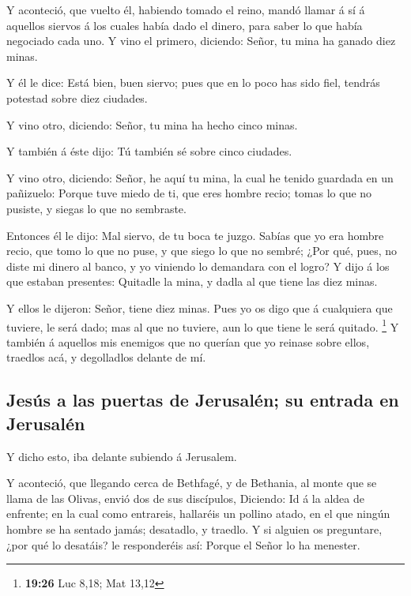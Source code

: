  Y aconteció, que vuelto él, habiendo tomado el reino,
mandó llamar á sí á aquellos siervos á los cuales había dado el dinero,
para saber lo que había negociado cada uno.  Y vino el
primero, diciendo: Señor, tu mina ha ganado diez minas.

 Y él le dice: Está bien, buen siervo; pues que en lo
poco has sido fiel, tendrás potestad sobre diez ciudades.

 Y vino otro, diciendo: Señor, tu mina ha hecho cinco
minas.

 Y también á éste dijo: Tú también sé sobre cinco
ciudades.

 Y vino otro, diciendo: Señor, he aquí tu mina, la cual
he tenido guardada en un pañizuelo:  Porque tuve miedo de
ti, que eres hombre recio; tomas lo que no pusiste, y siegas lo que no
sembraste.

 Entonces él le dijo: Mal siervo, de tu boca te juzgo.
Sabías que yo era hombre recio, que tomo lo que no puse, y que siego lo
que no sembré;  ¿Por qué, pues, no diste mi dinero al
banco, y yo viniendo lo demandara con el logro?  Y dijo á
los que estaban presentes: Quitadle la mina, y dadla al que tiene las
diez minas.

 Y ellos le dijeron: Señor, tiene diez minas.
 Pues yo os digo que á cualquiera que tuviere, le será
dado; mas al que no tuviere, aun lo que tiene le será quitado.
\footnote{\textbf{19:26} Luc 8,18; Mat 13,12}  Y también
á aquellos mis enemigos que no querían que yo reinase sobre ellos,
traedlos acá, y degolladlos delante de mí.

\hypertarget{jesuxfas-a-las-puertas-de-jerusaluxe9n-su-entrada-en-jerusaluxe9n}{%
\subsection{Jesús a las puertas de Jerusalén; su entrada en
Jerusalén}\label{jesuxfas-a-las-puertas-de-jerusaluxe9n-su-entrada-en-jerusaluxe9n}}

 Y dicho esto, iba delante subiendo á Jerusalem.

 Y aconteció, que llegando cerca de Bethfagé, y de
Bethania, al monte que se llama de las Olivas, envió dos de sus
discípulos,  Diciendo: Id á la aldea de enfrente; en la
cual como entrareis, hallaréis un pollino atado, en el que ningún hombre
se ha sentado jamás; desatadlo, y traedlo.  Y si alguien
os preguntare, ¿por qué lo desatáis? le responderéis así: Porque el
Señor lo ha menester.

